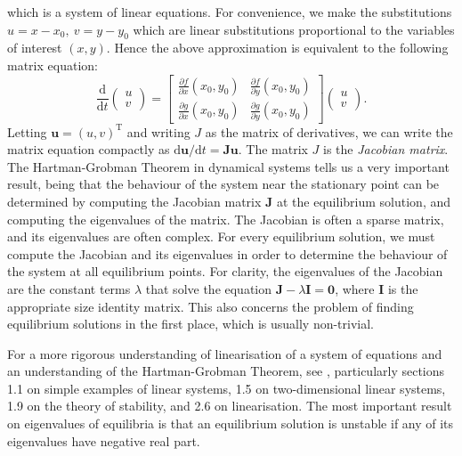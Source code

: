 \documentclass{book}
\begin{document}
which is a system of linear equations.
For convenience, we make the substitutions \(u = x-x_0,~v = y-y_0\) which are linear substitutions proportional to the variables of interest \((x,y)\).
Hence the above approximation is equivalent to the following matrix equation:
\begin{equation}
    \frac{\mathrm{d}}{\mathrm{d}t} \begin{pmatrix}
        u \\
        v
    \end{pmatrix} = \begin{bmatrix}
        \frac{\partial f}{\partial x}(x_0,y_0) & \frac{\partial f}{\partial y}(x_0,y_0) \\
        \frac{\partial g}{\partial x}(x_0,y_0) & \frac{\partial g}{\partial y}(x_0,y_0)
    \end{bmatrix} \begin{pmatrix}
        u \\
        v
    \end{pmatrix}.
\end{equation}
Letting \(\mathbf{u} = (u,v)^\mathrm{T}\) and writing \(J\) as the matrix of derivatives,
we can write the matrix equation compactly as \(\mathrm{d}\mathbf{u}/\mathrm{d}t = \mathbf{J}\mathbf{u}\).
The matrix \(J\) is the \textit{Jacobian matrix}.
The Hartman-Grobman Theorem in dynamical systems tells us a very important result,
being that the behaviour of the system near the stationary point can be determined by computing the Jacobian matrix \(\mathbf{J}\) at the equilibrium solution,
and computing the eigenvalues of the matrix.
The Jacobian is often a sparse matrix, and its eigenvalues are often complex.
For every equilibrium solution, we must compute the Jacobian and its eigenvalues in order to determine the behaviour of the system at all equilibrium points.
For clarity, the eigenvalues of the Jacobian are the constant terms \(\lambda\) that solve the equation \( \mathbf{J} -  \lambda \mathbf{I} = \mathbf{0}\),
where \(\mathbf{I}\) is the appropriate size identity matrix.
This also concerns the problem of finding equilibrium solutions in the first place, which is usually non-trivial.

For a more rigorous understanding of linearisation of a system of equations and an understanding of the Hartman-Grobman Theorem,
see \cite{perko_textbook_1996}, particularly sections
1.1 on simple examples of linear systems,
1.5 on two-dimensional linear systems,
1.9 on the theory of stability,
and 2.6 on linearisation.
The most important result on eigenvalues of equilibria is that an equilibrium solution is unstable if any of its eigenvalues have negative real part.






\end{document}
